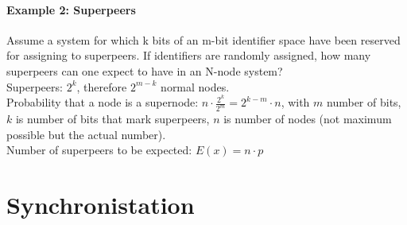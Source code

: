 \documentclass[ngerman,a4paper]{report}
\begin{document}
\subsubsection{Example 2: Superpeers}
Assume a system for which k bits of an m-bit identifier space have been reserved for assigning to superpeers. If identifiers are randomly assigned, how many superpeers can one expect to have in an N-node system? \\
Superpeers: $2^k$, therefore $2^{m-k}$ normal nodes.\\
Probability that a node is a supernode: $n\cdot \frac{2^k}{2^m} = 2^{k-m} \cdot n$, with $m$ number of bits, $k$ is number of bits that mark superpeers, $n$ is number of nodes (not maximum possible but the actual number).\\
Number of superpeers to be expected: $E(x)= n\cdot p$\\






\chapter{Synchronistation}
\end{document}
